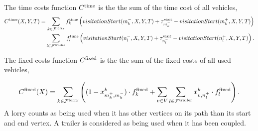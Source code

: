 The time costs function $C^{\rm time}$ is the the sum of the time cost of all vehicles,
\begin{align}
   C^{\rm time}(X,Y,T) =
   \sum_{k \in \mathcal F^{\rm lorry}} f^{\rm time}_k
   \left(
   visitationStart(m^-_k,X,Y,T) + \tau^{\rm visit}_{m^-_k} - visitationStart(m^+_k,X,Y,T)
   \right)  \notag \\
   \sum_{l \in \mathcal F^{\rm trailer}} f^{\rm time}_l
   \left(
   visitationStart(n^-_l,X,Y,T) + \tau^{\rm visit}_{n^-_l} - visitationStart(n^+_l,X,Y,T)
   \right) .
\end{align}


The fixed costs function $C^{\rm fixed}$ is the the sum of the fixed costs of all used vehicles,

\begin{align}
   C^{\rm fixed}(X) =
   \sum_{k \in \mathcal F^{\rm lorry}}
   \left(
   (1 - x^k_{m^+_k,m^-_k }) \cdot f^{\rm fixed}_k
   +
  \sum_{v \in V  }
   \sum_{l \in \mathcal F^{\rm trailer}}
   x^k_{v,n^+_l} \cdot f^{\rm fixed}_l
   \right).
\end{align}
A lorry counts as being used when it has other vertices on its path than its start and end vertex.
A trailer is considered as being used when it has been coupled.



